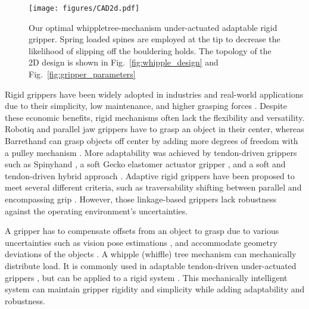 \documentclass[letterpaper, 10 pt, conference]{ieeeconf}  %
\newcommand{\fig}[1]{Fig.~\ref{#1}}
\begin{document}
 
 \begin{figure}[t!]
    \centering
    \texttt{[image: figures/CAD2d.pdf]}
     \caption{Our optimal whippletree-mechanism under-actuated adaptable rigid gripper. Spring loaded spines are employed at the tip to decrease the likelihood of slipping off the  bouldering holds. The topology of the 2D design is shown in \fig{fig:whipple_design} and \fig{fig:gripper_parameters}\label{fig:cad}}
\end{figure} 
 
 Rigid grippers have been widely adopted in industries and real-world applications due to their simplicity, low maintenance, and higher grasping forces \cite{industrial_gripper}. Despite these economic benefits, rigid mechanisms often lack the flexibility and versatility. Robotiq and parallel jaw grippers have to grasp an object in their center, whereas Barrethand can grasp objects off center by adding more degrees of freedom with a pulley mechanism \cite{underactuated_tendon}. More adaptability was achieved by tendon-driven grippers such as  Spinyhand \cite{spinyhand}, a soft Gecko elastomer actuator gripper \cite{gekko_soft}, and a soft and tendon-driven hybrid approach \cite{wire-driven_soft}.
 Adaptive rigid grippers have been proposed to meet several different criteria, such as traversability \cite{orient_opti} shifting between parallel and encompassing grip \cite{adaptable_gripper}. 
However, those linkage-based grippers lack robustness against the operating environment's uncertainties. 

 A gripper has to compensate offsets from an object to grasp due to various uncertainties such as vision pose estimations \cite{vision_opti}, and accommodate geometry deviations of the objects \cite{robust_opti}. A whipple (whiffle) tree mechanism can mechanically distribute load. It is commonly used in adaptable tendon-driven under-actuated grippers \cite{tendon_whiffle}, but can be applied to a rigid system \cite{whippletree_rigid}. This mechanically intelligent system can maintain gripper rigidity and simplicity while adding adaptability and robustness. 
 
\end{document}
